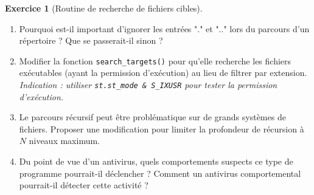 \documentclass[a4paper,11pt]{article}
\theoremstyle{plain}
\theoremstyle{definition}
\newtheorem{exercice}{Exercice}
\begin{document}
\begin{exercice}[Routine de recherche de fichiers cibles]
\begin{enumerate}
\item Pourquoi est-il important d'ignorer les entrées "." et ".." lors du parcours d'un répertoire ? Que se passerait-il sinon ?

\item Modifier la fonction \texttt{search\_targets()} pour qu'elle recherche les fichiers exécutables (ayant la permission d'exécution) au lieu de filtrer par extension.
\textit{Indication : utiliser \texttt{st.st\_mode \& S\_IXUSR} pour tester la permission d'exécution.}

\item Le parcours récursif peut être problématique sur de grands systèmes de fichiers. Proposer une modification pour limiter la profondeur de récursion à $N$ niveaux maximum.

\item Du point de vue d'un antivirus, quels comportements suspects ce type de programme pourrait-il déclencher ? Comment un antivirus comportemental pourrait-il détecter cette activité ?
\end{enumerate}

\end{exercice}
\end{document}
